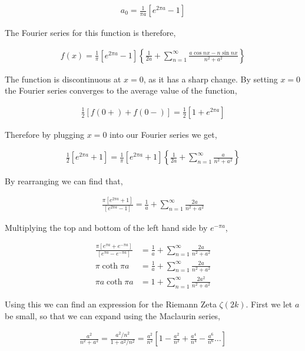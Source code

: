 \documentclass[11pt]{amsart}
\begin{document}
\begin{align*}
  a_0 = \frac{1}{\pi a}\left[e^{2\pi a}-1\right]
\end{align*}

The Fourier series for this function is therefore,

\begin{align*}
  f(x)=\frac{1}{\pi}\left[e^{2\pi a}-1\right]\left\{\frac{1}{2a}+\sum\limits_{n=1}^{\infty}\frac{a\cos{nx}-n\sin{nx}}{n^2+a^2}\right\}
\end{align*}

The function is discontinuous at $x = 0$, as it has a sharp change. By setting $x = 0$ the Fourier series converges to the average value of the function,

\begin{align*}
  \frac{1}{2}\left[f(0+)+f(0-)\right] = \frac{1}{2}\left[1+e^{2\pi a}\right]
\end{align*}

Therefore by plugging $x = 0$ into our Fourier series we get,

\begin{align*}
  \frac{1}{2}\left[e^{2\pi a}+1\right]=\frac{1}{\pi}\left[e^{2\pi a}+1\right]\left\{\frac{1}{2a}+\sum\limits_{n=1}^{\infty}\frac{a}{n^2+a^2}\right\}
\end{align*}

By rearranging we can find that,

\begin{align*}
  \frac{\pi\left[e^{2\pi a}+1\right]}{\left[e^{2\pi a}-1\right]}=\frac{1}{a}+\sum\limits_{n=1}^{\infty}\frac{2a}{n^2+a^2}
\end{align*}

Multiplying the top and bottom of the left hand side by $e^{-\pi a}$,

\begin{align*}
  \frac{\pi\left[e^{\pi a}+e^{-\pi a}\right]}{\left[e^{\pi a}-e^{-\pi a}\right]} &= \frac{1}{a}+\sum\limits_{n=1}^{\infty}\frac{2a}{n^2+a^2} \\
  \pi\coth{\pi a} &= \frac{1}{a}+\sum\limits_{n=1}^{\infty}\frac{2a}{n^2+a^2} \\
  \pi a\coth{\pi a} &= 1 + \sum\limits_{n=1}^{\infty}\frac{2a^2}{n^2+a^2}
\end{align*}

Using this we can find an expression for the Riemann Zeta $\zeta(2k)$. First we let $a$ be small, so that we can expand using the Maclaurin series,

\begin{align*}
  \frac{a^2}{n^2+a^2}=\frac{a^2/n^2}{1 + a^2/n^2} = \frac{a^2}{n^2}\left[1 - \frac{a^2}{n^2} + \frac{a^4}{n^4} - \frac{a^6}{n^6} \dots\right]
\end{align*}
\end{document}
